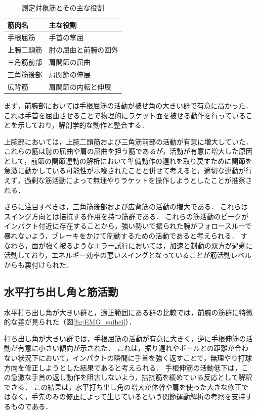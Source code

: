 \documentclass[../main]{subfiles}
\begin{document}
\begin{table}[htbp]
  \centering
  \caption{測定対象筋とその主な役割}
  \label{tab:muscle_roles1}
  \begin{tabular}{ll}
      \toprule
      \textbf{筋肉名} & \textbf{主な役割} \\
      \midrule
      手根屈筋 & 手首の掌屈 \\
      上腕二頭筋 & 肘の屈曲と前腕の回外 \\
      三角筋前部 & 肩関節の屈曲 \\
      三角筋後部 & 肩関節の伸展 \\
      広背筋 & 肩関節の内転と伸展 \\
      \bottomrule
  \end{tabular}
\end{table}

まず，前腕部においては手根屈筋の活動が被せ角の大きい群で有意に高かった．これは手首を屈曲させることで物理的にラケット面を被せる動作を行っていることを示しており，解剖学的な動作と整合する．

上腕部においては，上腕二頭筋および三角筋前部の活動が有意に増大していた．
これらの筋は肘の屈曲や肩の屈曲を担う筋であるが，活動が有意に増大した原因として，前節の関節運動の解析において準備動作の遅れを取り戻すために関節を急激に動かしている可能性が示唆されたことと併せて考えると，適切な連動が行えず，過剰な筋活動によって無理やりラケットを操作しようとしたことが推察される．

さらに注目すべきは，三角筋後部および広背筋の活動の増大である．
これらはスイング方向とは拮抗する作用を持つ筋群である．
これらの筋活動のピークがインパクト付近に存在することから，強い勢いで振られた腕がフォロースルーで暴れないよう，ブレーキをかけて制動するための活動であると考えられる．
すなわち，面が強く被るようなエラー試行においては，加速と制動の双方が過剰に活動しており，エネルギー効率の悪いスイングとなっていることが筋活動レベルからも裏付けられた．



\subsection{水平打ち出し角と筋活動}
水平打ち出し角が大きい群と，適正範囲にある群の比較では，前腕の筋群に特徴的な差が見られた（図\ref{fig:EMG_suihei}）．

打ち出し角が大きい群では，手根屈筋の活動が有意に大きく，逆に手根伸筋の活動が有意に小さい傾向が示された．
これは，振り遅れやボールとの距離が合わない状況下において，インパクトの瞬間に手首を強く返すことで，無理やり打球方向を修正しようとした結果であると考えられる．
手根伸筋の活動低下は，この急激な手首の返し動作を阻害しないよう，拮抗筋を緩めている反応として解釈できる．
この結果は，水平打ち出し角の増大が体幹や肩を使った大きな修正ではなく，手先のみの修正によって生じているという関節運動解析の考察を支持するものである．
\end{document}

